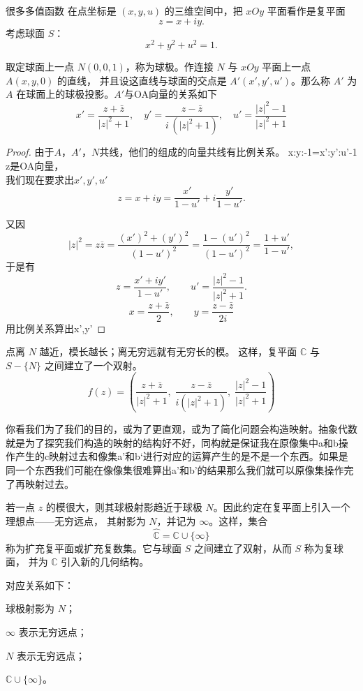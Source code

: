 \documentclass[lang=cn,10pt]{elegantbook}
\begin{document}
\begin{proposition}[引入复球面为了把无穷原点加入]
    
很多多值函数
在点坐标是 $(x,y,u)$ 的三维空间中，把 $xOy$ 平面看作是复平面
\[
z = x + iy.
\]
考虑球面 $S$：
\[
x^2 + y^2 + u^2 = 1.
\]

取定球面上一点 $N(0,0,1)$，称为球极。作连接 $N$ 与 $xOy$ 平面上一点 $A(x,y,0)$ 的直线，
并且设这直线与球面的交点是 $A'(x',y',u')$。那么称 $A'$ 为 $A$ 在球面上的球极投影。$A'$与OA向量的关系如下
\[
x' = \frac{z + \bar{z}}{|z|^2 + 1}, \quad
y' = \frac{z - \bar{z}}{i\,(|z|^2 + 1)}, \quad
u' = \frac{|z|^2 - 1}{|z|^2 + 1}
\]
\end{proposition}
\begin{proof}
    
由于$A$，$A'$，$N$共线，他们的组成的向量共线有比例关系。
x:y:-1=x':y':u'-1
z是OA向量，\\我们现在要求出$x
',y',u'$
\[
z = x + iy = \frac{x'}{1-u'} + i \frac{y'}{1-u'}.
\]

又因
\[
|z|^2 = z \overline{z} = \frac{(x')^2+(y')^2}{(1-u')^2}
= \frac{1-(u')^2}{(1-u')^2} = \frac{1+u'}{1-u'},
\]
于是有
\[
z = \frac{x'+iy'}{1-u'}, 
\qquad
u' = \frac{|z|^2-1}{|z|^2+1}.
\]
\[
x = \frac{z + \bar{z}}{2}, \qquad
y = \frac{z - \bar{z}}{2i}
\]用比例关系算出x',y'
\end{proof}
点离 $N$ 越近，模长越长；离无穷远就有无穷长的模。  
这样，复平面 $\mathbb{C}$ 与 $S-\{N\}$ 之间建立了一个双射。\[
f(z) = \left( \frac{z + \bar{z}}{|z|^2 + 1},\; 
             \frac{z - \bar{z}}{i(|z|^2 + 1)},\; 
             \frac{|z|^2 - 1}{|z|^2 + 1} \right)
\]
\begin{dxtips}[映射与抽代]
你看我们为了我们的目的，或为了更直观，或为了简化问题会构造映射。抽象代数就是为了探究我们构造的映射的结构好不好，同构就是保证我在原像集中a和b操作产生的c映射过去和像集a'和b‘进行对应的运算产生的是不是一个东西。如果是同一个东西我们可能在像像集很难算出a’和b'的结果那么我们就可以原像集操作完了再映射过去。
\end{dxtips}
\begin{proposition}[复球面与扩充复平面]
若一点 $z$ 的模很大，则其球极射影趋近于球极 $N$。因此约定在复平面上引入一个理想点——无穷远点，
其射影为 $N$，并记为 $\infty$。这样，集合
\[
\widehat{\mathbb{C}} = \mathbb{C} \cup \{\infty\}
\]
称为扩充复平面或扩充复数集。它与球面 $S$ 之间建立了双射，从而 $S$ 称为复球面，
并为 $\mathbb{C}$ 引入新的几何结构。

\medskip
对应关系如下：
\begin{description}[leftmargin=3cm]
  \item[无穷远点] 球极射影为 $N$；
  \item[复平面] $\infty$ 表示无穷远点；
  \item[球面] $N$ 表示无穷远点；
  \item[扩充复数集] $\mathbb{C}\cup\{\infty\}$。
\end{description}
\end{proposition}
\end{document}
